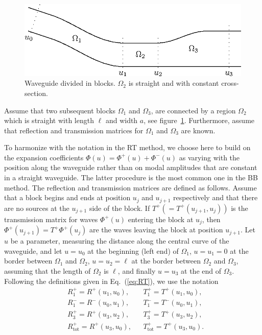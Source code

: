 \documentclass[numreferences]{kluwer}
\renewcommand{\Phi}{\varPhi}
\renewcommand{\vec}[1]{\bm{#1}}
\renewcommand{\Phi}{\varPhi}
\newcommand{\Ttot}{T^+_{\text{tot}}}
\newcommand{\Rtot}{R^+_{\text{tot}}}
\begin{document}
\begin{figure}[htb]
  \centering
  \includegraphics[width=\textwidth]{BBMwg-1}
  \caption{Waveguide divided in blocks. $\Omega_2$ is straight and
    with constant cross-section.}
  \label{fig:wg4}
\end{figure}


Assume that two subsequent blocks $\Omega_1$ and $\Omega_3$, are
connected by a region $\Omega_2$ which is straight with length $\ell$
and width $a$, see figure~\ref{fig:wg4}.  Furthermore, assume that
reflection and transmission matrices for $\Omega_1$ and $\Omega_3$ are
known.

To harmonize with the notation in the RT method, we choose here to
build on the expansion coefficients
$\vec\Phi(u)=\vec\Phi^+(u)+\vec\Phi^-(u)$ as varying with the position
along the waveguide rather than on modal amplitudes that are constant
in a straight waveguide. The latter procedure is the most common one
in the BB method. The reflection and transmission matrices are defined as
follows. Assume that a block begins and ends at position $u_j$ and
$u_{j+1}$ respectively and that there are no sources at the $u_{j+1}$
side of the block. If $T^+(=T^+(u_{j+1},u_j))$ is the transmission
matrix for waves $\vec\Phi^+(u)$ entering the block at $u_{j}$, then
$\vec\Phi^+(u_{j+1})=T^+\vec\Phi^+(u_{j})$ are the waves leaving the
block at position $u_{j+1}$. Let $u$ be a parameter, measuring the
distance along the central curve of the waveguide, and let $u=u_0$ at
the beginning (left end) of $\Omega_1$, $u=u_1=0$ at the border
between $\Omega_1$ and $\Omega_2$, $u=u_2=\ell$ at the border between
$\Omega_2$ and $\Omega_3$, assuming that the length of $\Omega_2$ is
$\ell$, and finally $u=u_3$ at the end of $\Omega_3$. Following the
definitions given in Eq.~(\ref{eq:RT}), we use the notation
\begin{align*}
  &R^+_1=R^+(u_1,u_0),&&T^+_1=T^+(u_1,u_0),\\
  &R^-_1=R^-(u_0,u_1),&&T^-_1=T^-(u_0,u_1),\\
  &R^+_3=R^+(u_3,u_2),&&T^+_3=T^+(u_3,u_2),\\
  &\Rtot=R^+(u_3,u_0),&&\Ttot=T^+(u_3,u_0).
\end{align*}
\end{document}
